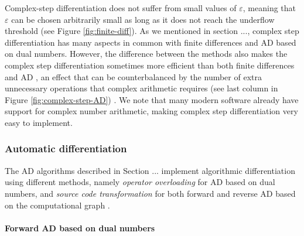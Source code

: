 Complex-step differentiation does not suffer from small values of $\varepsilon$, meaning that $\varepsilon$ can be chosen arbitrarily small \cite{martins2001connection} as long as it does not reach the underflow threshold \cite{Goldberg_1991_floatingpoint} (see Figure \ref{fig:finite-diff}). 
As we mentioned in section ..., complex step differentiation has many aspects in common with finite differences and AD based on dual numbers. 
However, the difference between the methods also makes the complex step differentiation sometimes more efficient than both finite differences and AD \cite{Lantoine_Russell_Dargent_2012}, an effect that can be counterbalanced by the number of extra unnecessary operations that complex arithmetic requires (see last column in Figure \ref{fig:complex-step-AD}) \cite{Martins_Sturdza_Alonso_2003_complex_differentiation}.
We note that many modern software already have support for complex number arithmetic, making complex step differentiation very easy to implement.

\subsubsection{Automatic differentiation}

The AD algorithms described in Section ... implement algorithmic differentiation using different methods, namely \textit{operator overloading} for AD based on dual numbers, and \textit{source code transformation} for both forward and reverse AD based on the computational graph \cite{martins2001connection}.

\paragraph{Forward AD based on dual numbers}
\label{section:software-Forward-AD}

